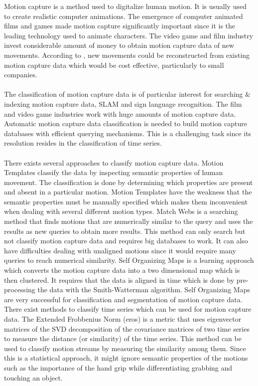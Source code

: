 \documentclass[10pt]{article}
\begin{document}
Motion capture is a method used to digitalize human motion. It is usually used to create realistic computer animations. The emergence of computer animated films and games made motion capture significantly important since it is the leading technology used to animate characters. The video game and film industry invest considerable amount of money to obtain motion capture data of new movements. According to \cite{EfficientMotionIndexing}, new movements could be reconstructed from existing motion capture data which would be cost effective, particularly to small companies. 
\\\\
The classification of motion capture data is of particular interest for searching \& indexing motion capture data\cite{EfficientMotionIndexing,AutomatedExtractionMotion}, SLAM\cite{EstimationHummanTraj} and sign language recognition\cite{ZhengSegmentationRecognition}. The film and video game industries work with huge amounts of motion capture data. Automatic motion capture data classification is needed to build motion capture databases with efficient querying mechanisms. This is a challenging task since its resolution resides in the classification of time series.
\\\\
There exists several approaches to classify motion capture data. Motion Templates \cite{MotionTemplates} classify the data by inspecting semantic properties of human movement. The classification is done by determining which properties are present and absent in a particular motion. Motion Templates have the weakness that the semantic properties must be manually specified which makes them inconvenient when dealing with several different motion types. Match Webs\cite{AutomatedExtractionMotion} is a searching method that finds motions that are numerically similar to the query and uses the results as new queries to obtain more results. This method can only search but not classify motion capture data and requires big databases to work. It can also have difficulties dealing with unaligned motions since it would require many queries to reach numerical similarity. Self Organizing Maps\cite{EfficientMotionIndexing} is a learning approach which converts the motion capture data into a two dimensional map which is then clustered. It requires that the data is aligned in time which is done by pre-processing the data with the Smith-Watterman algorithm. Self Organizing Maps are very successful for classification and segmentation of motion capture data. There exist methods to classify time series which can be used for motion capture data. The Extended Frobbenius Norm (eros)\cite{SimilarityMeasure} is a metric that uses eigenvector matrices of the SVD decomposition of the covariance matrices of two time series to measure the distance (or similarity) of the time series. This method can be used to classify motion streams by measuring the similarity among them. Since this is a statistical approach, it might ignore semantic properties of the motions such as the importance of the hand grip while differentiating grabbing and touching an object.
\end{document}
